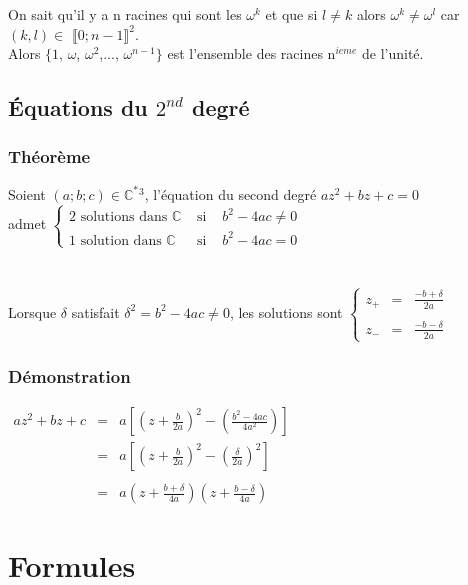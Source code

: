 \documentclass[a4paper,10pt]{book}
\newcommand{\C}{\mathbb{C}}
\begin{document}
On sait qu'il y a n racines qui sont les $\omega^{k}$ et que si $l\neq k$ alors $\omega^{k}\neq \omega^{l}$ car $(k,l) \in$ $\llbracket 0;n-1 \rrbracket^{2}$.\\

Alors $\{1$, $\omega$, $\omega^{2}$,..., $\omega^{n-1}\}$ est l'ensemble des racines n$^{ieme}$ de l'unité.

\subsection{Équations du $2^{nd}$ degré}
\subsubsection{Théorème}
Soient $(a; b; c) \in \C^{*}{}^{3}$, l'équation du second degré $az^{2}+bz+c=0$\\
admet $\left \{ \begin{array}{rcl} \text{2 solutions dans } \C &\text{ si }& b^{2}-4ac\neq 0\\ \text{1 solution dans } \C &\text{ si }& b^{2}-4ac=0 \end{array} \right .$\\\\\\
Lorsque $\delta$ satisfait $\delta^{2}=b^{2}-4ac\neq 0$, les solutions sont $\left \{ \begin{array}{rcl} z_{+}&=&\frac{-b+\delta}{2a} \\\\ z_{-}&=&\frac{-b-\delta}{2a} \end{array} \right . $\\

\subsubsection{Démonstration}
$\begin{array}{rcl} az^{2}+bz+c&=&a[(z+\frac{b}{2a})^{2}-(\frac{b^{2}-4ac}{4a^{2}})] \\ &=&a[(z+\frac{b}{2a})^{2}-(\frac{\delta}{2a})^{2}] \\\\ &=& a(z+\frac{b+\delta}{4a})(z+\frac{b-\delta}{4a}) \end{array}$

\newpage

\section{Formules}
\end{document}
